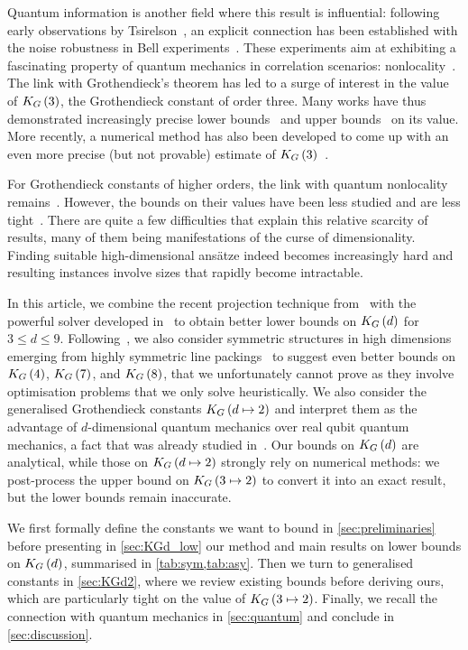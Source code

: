 \documentclass[10pt,aps,notitlepage,onecolumn,pra,superscriptaddress]{revtex4-1}
\renewcommand{\leq}{\leqslant}
\newcommand\KG[2]{K_G\left({#1}\ifx#2\empty\else\mapsto\fi{#2}\right)}
\begin{document}
Quantum information is another field where this result is influential: following early observations by Tsirelson~\cite{Tsi87}, an explicit connection has been established with the noise robustness in Bell experiments~\cite{Bel64,AGT06}.
These experiments aim at exhibiting a fascinating property of quantum mechanics in correlation scenarios: nonlocality~\cite{BCP+14}.
The link with Grothendieck's theorem has led to a surge of interest in the value of $\KG{3}{}$, the Grothendieck constant of order three.
Many works have thus demonstrated increasingly precise lower bounds~\cite{CHSH69,Ver08,HLZ+15,BNV16,DBV17,DIB+23} and upper bounds~\cite{Kri79,HQV+17,DIB+23} on its value.
More recently, a numerical method has also been developed to come up with an even more precise (but not provable) estimate of $\KG{3}{}$~\cite{SM25}.

For Grothendieck constants of higher orders, the link with quantum nonlocality remains~\cite{AGT06,VP08}.
However, the bounds on their values have been less studied and are less tight~\cite{Kri79,FR94,Ver08,BBT11,HLZ+15,DBV17}.
There are quite a few difficulties that explain this relative scarcity of results, many of them being manifestations of the curse of dimensionality.
Finding suitable high-dimensional ansätze indeed becomes increasingly hard and resulting instances involve sizes that rapidly become intractable.

In this article, we combine the recent projection technique from~\cite{DIB+23} with the powerful solver developed in~\cite{DBV17} to obtain better lower bounds on $\KG{d}{}$ for $3\leq d\leq9$.
Following~\cite{FR94}, we also consider symmetric structures in high dimensions emerging from highly symmetric line packings~\cite{FJM18} to suggest even better bounds on $\KG{4}{}$, $\KG{7}{}$, and $\KG{8}{}$, that we unfortunately cannot prove as they involve optimisation problems that we only solve heuristically.
We also consider the generalised Grothendieck constants $\KG{d}{2}$ and interpret them as the advantage of $d$-dimensional quantum mechanics over real qubit quantum mechanics, a fact that was already studied in~\cite{VP08,VP09}.
Our bounds on $\KG{d}{}$ are analytical, while those on $\KG{d}{2}$ strongly rely on numerical methods: we post-process the upper bound on $\KG{3}{2}$ to convert it into an exact result, but the lower bounds remain inaccurate.

We first formally define the constants we want to bound in \cref{sec:preliminaries} before presenting in \cref{sec:KGd_low} our method and main results on lower bounds on $\KG{d}{}$, summarised in \cref{tab:sym,tab:asy}.
Then we turn to generalised constants in \cref{sec:KGd2}, where we review existing bounds before deriving ours, which are particularly tight on the value of $\KG{3}{2}$.
Finally, we recall the connection with quantum mechanics in \cref{sec:quantum} and conclude in \cref{sec:discussion}.
\end{document}
